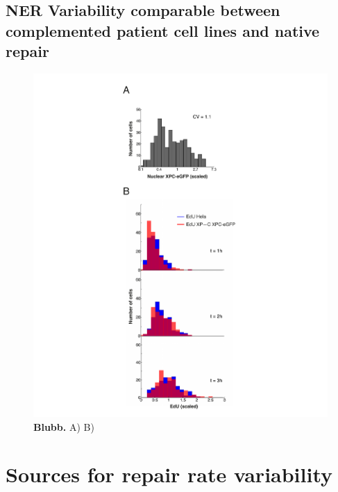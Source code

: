 \subsection{NER Variability comparable between complemented patient cell lines and native repair } 
\begin{figure}[htbp]
	\begin{center}
		\includegraphics[width=1\textwidth]{Abbildungen/figure3_4.pdf}
		\caption{\textbf{Blubb.} A) B) }
		\label{fig:consistVariability}
	\end{center}
\end{figure}


\section{Sources for repair rate variability}

